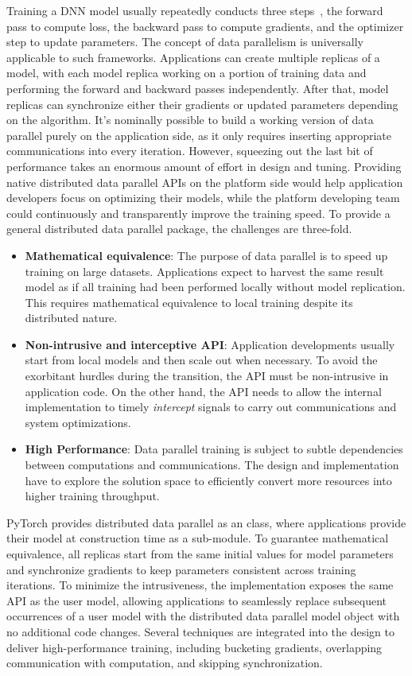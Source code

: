 Training a DNN model usually repeatedly conducts three steps~\cite{lecun1988theoretical}, the forward pass to compute loss, the backward pass to compute gradients, and the optimizer step to update parameters. The concept of data parallelism is universally applicable to such frameworks. Applications can create multiple replicas of a model, with each model replica working on a portion of training data and performing the forward and backward passes independently. After that, model replicas can synchronize either their gradients or updated parameters depending on the algorithm. It's nominally possible to build a working version of data parallel purely on the application side, as it only requires inserting appropriate communications into every iteration. However, squeezing out the last bit of performance takes an enormous amount of effort in design and tuning. Providing native distributed data parallel APIs on the platform side would help application developers focus on optimizing their models, while the platform developing team could continuously and transparently improve the training speed. To provide a general distributed data parallel package, the challenges are three-fold.
\begin{itemize}
    \item \textbf{Mathematical equivalence}: The purpose of data parallel is to speed up training on large datasets. Applications expect to harvest the same result model as if all training had been performed locally without model replication. This requires mathematical equivalence to local training despite its distributed nature.
    \item \textbf{Non-intrusive and interceptive API}: Application developments usually start from local models and then scale out when necessary. To avoid the exorbitant hurdles during the transition, the API must be non-intrusive in application code. On the other hand, the API needs to allow the internal implementation to timely \emph{intercept} signals to carry out communications and system optimizations. 
    \item \textbf{High Performance}: Data parallel training is subject to subtle dependencies between computations and communications. The design and implementation have to explore the solution space to efficiently convert more resources into higher training throughput.
\end{itemize}
PyTorch provides distributed data parallel as an  class, where applications provide their model at construction time as a sub-module. To guarantee mathematical equivalence, all replicas start from the same initial values for model parameters and synchronize gradients to keep parameters consistent across training iterations. To minimize the intrusiveness, the implementation exposes the same ~\cite{forward} API as the user model, allowing applications to seamlessly replace subsequent occurrences of a user model with the distributed data parallel model object with no additional code changes. Several techniques are integrated into the design to deliver high-performance training, including bucketing gradients, overlapping communication with computation, and skipping synchronization.

